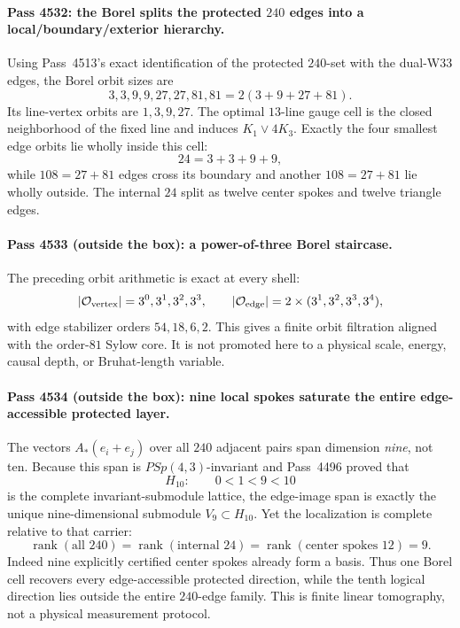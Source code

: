 \paragraph{Pass 4532: the Borel splits the protected $240$ edges into a local/boundary/exterior hierarchy.}
Using Pass~4513's exact identification of the protected $240$-set with the
dual-W33 edges, the Borel orbit sizes are
\[
 \boxed{3,3,9,9,27,27,81,81=2(3+9+27+81).}
\]
Its line-vertex orbits are $1,3,9,27$.  The optimal $13$-line gauge cell is the
closed neighborhood of the fixed line and induces $K_1\vee4K_3$.  Exactly the
four smallest edge orbits lie wholly inside this cell:
\[
 24=3+3+9+9,
\]
while $108=27+81$ edges cross its boundary and another $108=27+81$ lie wholly
outside.  The internal $24$ split as twelve center spokes and twelve triangle
edges.

\paragraph{Pass 4533 (outside the box): a power-of-three Borel staircase.}
The preceding orbit arithmetic is exact at every shell:
\[
 |\mathcal O_{\rm vertex}|=3^0,3^1,3^2,3^3,
 \qquad
 |\mathcal O_{\rm edge}|=2\times(3^1,3^2,3^3,3^4),
\]
with edge stabilizer orders $54,18,6,2$.  This gives a finite orbit filtration
aligned with the order-$81$ Sylow core.  It is not promoted here to a physical
scale, energy, causal depth, or Bruhat-length variable.

\paragraph{Pass 4534 (outside the box): nine local spokes saturate the entire edge-accessible protected layer.}
The vectors $A_*(e_i+e_j)$ over all $240$ adjacent pairs span dimension
\emph{nine}, not ten.  Because this span is $PSp(4,3)$-invariant and Pass~4496
proved that
\[
 H_{10}:\qquad 0<1<9<10
\]
is the complete invariant-submodule lattice, the edge-image span is exactly the
unique nine-dimensional submodule $V_9\subset H_{10}$.  Yet the localization is
complete relative to that carrier:
\[
 \operatorname{rank}(\text{all }240)=
 \operatorname{rank}(\text{internal }24)=
 \operatorname{rank}(\text{center spokes }12)=9.
\]
Indeed nine explicitly certified center spokes already form a basis.  Thus one
Borel cell recovers every edge-accessible protected direction, while the tenth
logical direction lies outside the entire $240$-edge family.  This is finite
linear tomography, not a physical measurement protocol.


